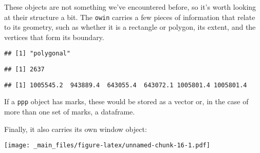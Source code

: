 \documentclass[
]{book}
\newenvironment{Shaded}{\begin{snugshade}}{\end{snugshade}}
\newcommand{\FunctionTok}[1]{\textcolor[rgb]{0.00,0.00,0.00}{#1}}
\newcommand{\NormalTok}[1]{#1}
\newcommand{\SpecialCharTok}[1]{\textcolor[rgb]{0.00,0.00,0.00}{#1}}
\begin{document}
These objects are not something we've encountered before, so it's worth looking at their structure a bit. The \texttt{owin} carries a few pieces of information that relate to its geometry, such as whether it is a rectangle or polygon, its extent, and the vertices that form its boundary.

\begin{Shaded}
\end{Shaded}

\begin{verbatim}
## [1] "polygonal"
\end{verbatim}

\begin{Shaded}
\end{Shaded}

\begin{verbatim}
## [1] 2637
\end{verbatim}

\begin{Shaded}
\end{Shaded}

\begin{verbatim}
## [1] 1005545.2  943889.4  643055.4  643072.1 1005801.4 1005801.4
\end{verbatim}

If a \texttt{ppp} object has marks, these would be stored as a vector or, in the case of more than one set of marks, a dataframe.

Finally, it also carries its own window object:

\begin{Shaded}
\end{Shaded}

\texttt{[image: \_main\_files/figure-latex/unnamed-chunk-16-1.pdf]}
\end{document}
